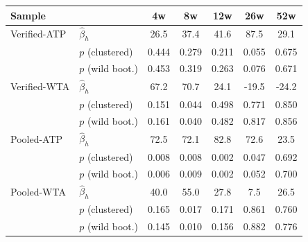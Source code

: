 \begin{tabular}{ll*{5}{c}}
\toprule
Sample & & 4w & 8w & 12w & 26w & 52w \\
\midrule
Verified-ATP & $\hat{\beta}_h$ & 26.5 & 37.4 & 41.6 & 87.5 & 29.1 \\
 & $p$ (clustered) & 0.444 & 0.279 & 0.211 & 0.055 & 0.675 \\
 & $p$ (wild boot.) & 0.453 & 0.319 & 0.263 & 0.076 & 0.671 \\[0.3em]
Verified-WTA & $\hat{\beta}_h$ & 67.2 & 70.7 & 24.1 & -19.5 & -24.2 \\
 & $p$ (clustered) & 0.151 & 0.044 & 0.498 & 0.771 & 0.850 \\
 & $p$ (wild boot.) & 0.161 & 0.040 & 0.482 & 0.817 & 0.856 \\[0.3em]
Pooled-ATP & $\hat{\beta}_h$ & 72.5 & 72.1 & 82.8 & 72.6 & 23.5 \\
 & $p$ (clustered) & 0.008 & 0.008 & 0.002 & 0.047 & 0.692 \\
 & $p$ (wild boot.) & 0.006 & 0.009 & 0.002 & 0.052 & 0.700 \\[0.3em]
Pooled-WTA & $\hat{\beta}_h$ & 40.0 & 55.0 & 27.8 & 7.5 & 26.5 \\
 & $p$ (clustered) & 0.165 & 0.017 & 0.171 & 0.861 & 0.760 \\
 & $p$ (wild boot.) & 0.145 & 0.010 & 0.156 & 0.882 & 0.776 \\[0.3em]
\bottomrule
\end{tabular}
